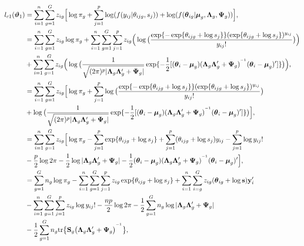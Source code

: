 \documentclass[12pt]{article}
\newcommand{\inv}{^{\raisebox{.2ex}{$\scriptscriptstyle-1$}}}
\begin{document}
\begin{equation*}
\label{lc1}
\begin{split}
l_{c1}(\boldsymbol{\vartheta}_1) & = \sum_{i=1}^n \sum_{g=1}^G z_{ig} \Big[ \log \pi_g + \sum_{j=1}^p \log (f(y_{ij}|\theta_{ijg}, s_j)) + \log (f(\boldsymbol{\theta}_{ig}|\boldsymbol{\mu}_g,\mathbf{\Lambda}_g, \mathbf{\Psi}_g)) \Big], \\
& = 
\sum_{i=1}^n \sum_{g=1}^G z_{ig} \log \pi_g + \sum_{i=1}^n \sum_{g=1}^G \sum_{j=1}^p z_{ig} \Big( \log \big( \frac{\exp\{-\exp\{\theta_{ijg} + \log s_{j}\}\} (\exp\{\theta_{ijg} + \log s_{j}\})^{y_{ij}}}{y_{ij} !}\big) \Big) \\
& + \sum_{i=1}^n \sum_{g=1}^G z_{ig} \Big( \log \big(\frac{1}{\sqrt{(2\pi)^p | {\mathbf{\Lambda}_g \mathbf{\Lambda}_g^{\prime} + \mathbf{\Psi}_g} |}} \exp\{-\frac{1}{2}[(\boldsymbol{\theta}_i - \boldsymbol{\mu}_g) (\mathbf{\Lambda}_g \mathbf{\Lambda}_g^{\prime} + \mathbf{\Psi}_g)^{\inv} (\boldsymbol{\theta}_i - \boldsymbol{\mu}_g)^{\prime} ]\} \big) \Big), \\
& = \sum_{i=1}^n \sum_{g=1}^G z_{ig} \Big[ \log \pi_g + \sum_{j=1}^p  \log \big( \frac{\exp\{-\exp\{\theta_{ijg} + \log s_{j}\}\} (\exp\{\theta_{ijg} + \log s_{j}\})^{y_{ij}}}{y_{ij} !}\big) \\
& + \log \big(\frac{1}{\sqrt{(2\pi)^p | {\mathbf{\Lambda}_g \mathbf{\Lambda}_g^{\prime} + \mathbf{\Psi}_g} |}} \exp\{-\frac{1}{2}[(\boldsymbol{\theta}_i - \boldsymbol{\mu}_g) (\mathbf{\Lambda}_g \mathbf{\Lambda}_g^{\prime} + \mathbf{\Psi}_g)^{\inv} (\boldsymbol{\theta}_i - \boldsymbol{\mu}_g)^{\prime} ]\} \big) \Big],\\
& = \sum_{i=1}^n \sum_{g=1}^G  z_{ig} \Big[ \log \pi_g - \sum_{j=1}^p \exp\{\theta_{ijg} + \log s_{j}\} + \sum_{j=1}^p (\theta_{ijg} + \log s_j) y_{ij} - \sum_{j=1}^p \log y_{ij} ! \\
& - \frac{p}{2} \log 2 \pi - \frac{1}{2} \log | \mathbf{\Lambda}_g \mathbf{\Lambda}_g^{\prime} + \mathbf{\Psi}_g | - \frac{1}{2} (\boldsymbol{\theta}_i - \boldsymbol{\mu}_g) (\mathbf{\Lambda}_g \mathbf{\Lambda}_g^{\prime} + \mathbf{\Psi}_g)^{\inv} (\boldsymbol{\theta}_i - \boldsymbol{\mu}_g)^{\prime}\Big],\\
& = \sum_{g=1}^G  n_g \log \pi_g - \sum_{i=1}^n \sum_{g=1}^G \sum_{j=1}^p z_{ig} \exp \{\theta_{ijg} + \log s_j\} + \sum_{i=1}^n \sum_{i=g}^G z_{ig}  (\boldsymbol{\theta}_{ig} + \log \mathbf{s}) \mathbf{y}_i^{\prime} \\
& - \sum_{i=1}^n \sum_{g=1}^G \sum_{j=1}^p z_{ig} \log y_{ij}! - \frac{np}{2} \log 2 \pi - \frac{1}{2} \sum_{g=1}^G n_g \log | \mathbf{\Lambda}_g \mathbf{\Lambda}_g^{\prime} + \mathbf{\Psi}_g| \\
& - \frac{1}{2} \sum_{g=1}^G n_g \text{tr} \big\{ \mathbf{S}_g \big( \mathbf{\Lambda}_g \mathbf{\Lambda}_g^{\prime} + \mathbf{\Psi}_g \big)^{\inv} \big\},
\end{split}
\end{equation*}
\end{document}
